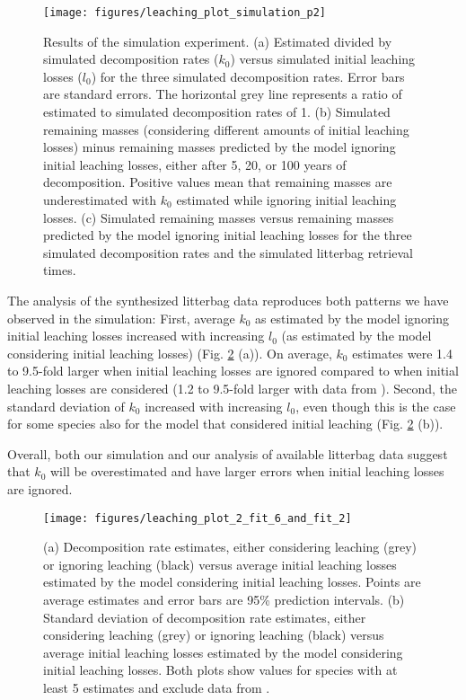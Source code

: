 \documentclass[bg, manuscript]{copernicus}
\begin{document}
\begin{figure}[H]

{\centering \texttt{[image: figures/leaching\_plot\_simulation\_p2]} 

}

\caption{Results of the simulation experiment. (a) Estimated divided by simulated decomposition rates (\(k_0\)) versus simulated initial leaching losses (\(l_0\)) for the three simulated decomposition rates. Error bars are standard errors. The horizontal grey line represents a ratio of estimated to simulated decomposition rates of 1. (b) Simulated remaining masses (considering different amounts of initial leaching losses) minus remaining masses predicted by the model ignoring initial leaching losses, either after 5, 20, or 100 years of decomposition. Positive values mean that remaining masses are underestimated with \(k_0\) estimated while ignoring initial leaching losses. (c) Simulated remaining masses versus remaining masses predicted by the model ignoring initial leaching losses for the three simulated decomposition rates and the simulated litterbag retrieval times.}\label{fig:out-p-simulation-p2}
\end{figure}

The analysis of the synthesized litterbag data reproduces both patterns we have observed in the simulation: First, average \(k_0\) as estimated by the model ignoring initial leaching losses increased with increasing \(l_0\) (as estimated by the model considering initial leaching losses) (Fig. \ref{fig:out-mm27-1-mm28-1-p2} (a)). On average, \(k_0\) estimates were 1.4 to 9.5-fold larger when initial leaching losses are ignored compared to when initial leaching losses are considered (1.2 to 9.5-fold larger with data from \citet{Bengtsson.2017}). Second, the standard deviation of \(k_0\) increased with increasing \(l_0\), even though this is the case for some species also for the model that considered initial leaching (Fig. \ref{fig:out-mm27-1-mm28-1-p2} (b)).

Overall, both our simulation and our analysis of available litterbag data suggest that \(k_0\) will be overestimated and have larger errors when initial leaching losses are ignored.



\begin{figure}[H]

{\centering \texttt{[image: figures/leaching\_plot\_2\_fit\_6\_and\_fit\_2]} 

}

\caption{(a) Decomposition rate estimates, either considering leaching (grey) or ignoring leaching (black) versus average initial leaching losses estimated by the model considering initial leaching losses. Points are average estimates and error bars are 95\% prediction intervals. (b) Standard deviation of decomposition rate estimates, either considering leaching (grey) or ignoring leaching (black) versus average initial leaching losses estimated by the model considering initial leaching losses. Both plots show values for species with at least 5 estimates and exclude data from \citet{Bengtsson.2017}.}\label{fig:out-mm27-1-mm28-1-p2}
\end{figure}
\end{document}

